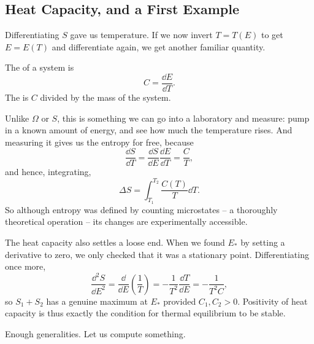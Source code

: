 \subsection{Heat Capacity, and a First Example}

Differentiating $S$ gave us temperature. If we now invert $T = T(E)$ to get $E = E(T)$ and differentiate again, we get another familiar quantity.

\begin{definition}
	The  of a system is
	$$
	C = \frac{\dd E}{\dd T}.
	$$
	The  is $C$ divided by the mass of the system.
\end{definition}

Unlike $\Omega$ or $S$, this is something we can go into a laboratory and measure: pump in a known amount of energy, and see how much the temperature rises. And measuring it gives us the entropy for free, because
$$
\frac{\dd S}{\dd T} = \frac{\dd S}{\dd E}\frac{\dd E}{\dd T} = \frac{C}{T},
$$
and hence, integrating,
$$
\Delta S = \int_{T_1}^{T_2} \frac{C(T)}{T} \dd T.
$$
So although entropy was defined by counting microstates -- a thoroughly theoretical operation -- its changes are experimentally accessible.

The heat capacity also settles a loose end. When we found $E_*$ by setting a derivative to zero, we only checked that it was a stationary point. Differentiating once more,
$$
\frac{\dd^2 S}{\dd E^2} = \frac{\dd}{\dd E}\left(\frac 1T\right) = -\frac{1}{T^2}\frac{\dd T}{\dd E} = -\frac{1}{T^2 C},
$$
so $S_1 + S_2$ has a genuine maximum at $E_*$ provided $C_1, C_2 > 0$. Positivity of heat capacity is thus exactly the condition for thermal equilibrium to be stable.

Enough generalities. Let us compute something.

